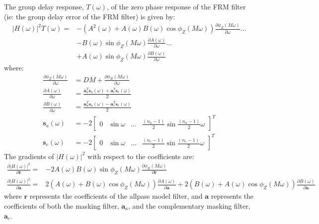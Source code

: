 \documentclass[a4paper,twoside,10pt,english]{report}
\begin{document}
The group delay response, $T\left(\omega\right)$, of the zero phase response 
of the FRM filter (ie: the group delay error of the FRM filter) is
given by:
\begin{align*}
\left|H\left(\omega\right)\right|^{2}T\left(\omega\right) =&
 -\left(A^{2}\left(\omega\right)+A\left(\omega\right)B\left(\omega\right)
  \cos\phi_{Z}\left(M\omega\right)\right)
  \frac{\partial\phi_{Z}\left(M\omega\right)}{\partial\omega} \hdots \\
& -B\left(\omega\right)\sin\phi_{Z}\left(M\omega\right)
  \frac{\partial A\left(\omega\right)}{\partial\omega} \hdots \\
& +A\left(\omega\right)\sin\phi_{Z}\left(M\omega\right)
  \frac{\partial B\left(\omega\right)}{\partial\omega}
\end{align*}
where:
\begin{align*}
\frac{\partial \phi_{Z}\left(M\omega\right)}{\partial\omega} &=
DM+\frac{\partial \phi_{R}\left(M\omega\right)}{\partial\omega}\\
\frac{\partial A\left(\omega\right)}{\partial\omega} &=
\frac{\boldsymbol{a}_{a}^{T}\boldsymbol{s}_{a}\left(\omega\right)+
\boldsymbol{a}_{c}^{T}\boldsymbol{s}_{c}\left(\omega\right)}{2} \\
\frac{\partial B\left(\omega\right)}{\partial\omega} &=
\frac{\boldsymbol{a}_{a}^{T}\boldsymbol{s}_{a}\left(\omega\right)-
\boldsymbol{a}_{c}^{T}\boldsymbol{s}_{c}\left(\omega\right)}{2} \\
\boldsymbol{s}_{a}\left(\omega\right) &= 
-2\left[\begin{array}{cccc}
0 & \sin \omega & \hdots & \frac{\left(n_{a}-1\right)}{2}
                           \sin \frac{\left(n_{a}-1\right)}{2}\omega
\end{array}\right]^{T} \\
\boldsymbol{s}_{c}\left(\omega\right) &= 
-2\left[\begin{array}{cccc}
0 & \sin \omega & \hdots & \frac{\left(n_{c}-1\right)}{2}
                           \sin \frac{\left(n_{c}-1\right)}{2}\omega
\end{array}\right]^{T}
\end{align*}
The gradients of $\left|H\left(\omega\right)\right|^{2}$ with respect to the 
coefficients are:
\begin{align*}
\frac{\partial\left|H\left(\omega\right)\right|^{2}}{\partial\boldsymbol{r}}=&
-2A\left(\omega\right)B\left(\omega\right)\sin\phi_{Z}\left(M\omega\right)
\frac{\partial \phi_{R}\left(M\omega\right)}{\partial\boldsymbol{r}} \\
\frac{\partial\left|H\left(\omega\right)\right|^{2}}{\partial\boldsymbol{a}}=&
2\left(A\left(\omega\right)+B\left(\omega\right)\cos\phi_{Z}\left(M\omega\right)
\right)\frac{\partial A\left(\omega\right)}{\partial\boldsymbol{a}}+
2\left(B\left(\omega\right)+A\left(\omega\right)\cos\phi_{Z}\left(M\omega\right)
\right)\frac{\partial B\left(\omega\right)}{\partial\boldsymbol{a}}
\end{align*}
where $\boldsymbol{r}$ represents the coefficients of the allpass model filter,
and $\boldsymbol{a}$ represents the coefficients of both the masking filter, 
$\boldsymbol{a}_{a}$, and the complementary masking filter, $\boldsymbol{a}_{c}$.
\end{document}
